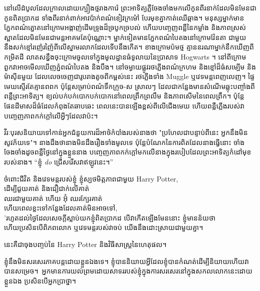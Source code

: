 {{{{{\later

នៅលើដំបូលដែលក្រាលដោយក្បឿងថ្មរាងការ៉េ ព្រះអាទិត្យភ្លឺចែងចាំងមកលើកូនពីរនាក់ដែលមិនមែនជាកូនពិតប្រាកដ ទាំងពីរនាក់ពាក់អាវប៉ាក់ពណ៌ខៀវក្រម៉ៅ បែរមុខគ្នាកាត់ឈើឆ្កាង។ មនុស្សម្នាក់មានភ្នែកពណ៌ត្នោតនៅក្រោមអង្កាញ់ដើមទ្រូងដ៏ច្របូកច្របល់ ហើយបញ្ចេញពន្លឺនៃកម្លាំង និងភាពស្រស់ស្អាតដែលមិនមែនជាមន្តអាគមតែប៉ុណ្ណោះ។ ម្នាក់ទៀតមានភ្នែកពណ៌បៃតងនៅក្រោមវ៉ែនតា ជាមួយនឹងសក់ខ្មៅរញ៉េរញ៉ៃពីលើស្នាមរលាកដែលទើបនឹងកើត។ ខាងក្រោមប៉មថ្ម គ្មាននរណាម្នាក់នឹកឃើញពីកម្រិតដី លាតសន្ធឹងចុះក្រោមចូលទៅក្នុងមូលដ្ឋានធំទូលាយនៃប្រាសាទ Hogwarts ។ នៅពីក្រោមពួកវាអាចមើលឃើញភ្នំពណ៌បៃតង និងបឹង។ នៅចម្ងាយផ្លូវរថភ្លើងពណ៌ក្រហម និងខ្មៅដ៏ធំសម្បើម និងម៉ាស៊ីនមួយ ដែលលេចចេញជារូបរាងតូចពីកម្ពស់នេះ រថភ្លើងទាំង Muggle ឬវេទមន្តពេញលេញ។ ផ្ទៃមេឃស្ទើរតែគ្មានពពក ប៉ុន្តែសម្រាប់ពណ៌ទឹកក្រូច-ស ស្រាលៗ ដែលជាកន្លែងមានសំណើមឆ្លុះបញ្ចាំងពីពន្លឺព្រះអាទិត្យ។ ខ្យល់បក់បក់បោកបក់បោកនៅពេលព្រឹកព្រលឹម និងភាពសើមនៃពេលព្រឹក។ ប៉ុន្តែ ផែនដីមាសដ៏ធំដែលកំពុងតែឆាបឆេះ ពេលនេះបានឡើងខ្ពស់ពីលើជើងមេឃ ហើយពន្លឺភ្លើងរបស់វាបញ្ចេញភាពកក់ក្តៅលើអ្វីៗដែលវាប៉ះ។

វីរៈបុរសនិយាយទៅកាន់អ្នកជំនួយការដ៏អាថ៌កំបាំងរបស់នាងថា "ប្រហែលជាបន្ទាប់ពីនេះ អ្នកនឹងមិនសូវភ័យទេ"។ នាងដឹងថានាងមិនដឹងរឿងទាំងមូលទេ ប៉ុន្តែបំណែកនៃការពិតដែលនាងធ្វើនោះ ចាំងចែងចាំងដូចពន្លឺថ្ងៃនៅក្នុងខ្លួននាង បញ្ចេញភាពកក់ក្តៅមកលើនាងក្នុងរបៀបដែលព្រះអាទិត្យកំដៅមុខរបស់នាង។ “ខ្ញុំ \emph{do} ជ្រើសរើសវាឥឡូវនេះ។”

\begin{em}
\noindent{}ចំពោះជីវិត និងវេទមន្តរបស់ខ្ញុំ ខ្ញុំស្បថមិត្តភាពជាមួយ Harry Potter,\\
ដើម្បីជួយគាត់ និងជឿជាក់លើគាត់\\
ឈរជាមួយគាត់ ហើយ អ៊ុំ ឈរក្បែរគាត់ \\
ហើយពេលខ្លះទៅកន្លែងដែលគាត់មិនអាចទៅ,\\
'រហូតដល់ថ្ងៃដែលសេចក្តីស្លាប់យកខ្ញុំពិតប្រាកដ បើវាកើតឡើងមែននោះ ខ្ញុំមានន័យថា\\
ហើយប្រសិនបើពិភពលោក ឬវេទមន្តរបស់វាចប់ យើងនឹងដោះស្រាយជាមួយគ្នា។
\end{em}

\newpage
\begin{chapterOpeningAuthorNote}
នេះគឺជាចុងបញ្ចប់នៃ Harry Potter និងវិធីសាស្រ្តនៃហេតុផល។

ខ្ញុំនឹងមិនសរសេរភាគបន្តដោយខ្លួនឯងទេ។ ខ្ញុំ​បាន​និយាយ​អ្វី​ដែល​ខ្ញុំ​បាន​កំណត់​ដើម្បី​និយាយ​ហើយ​វា​បាន​សម្រេច​។\
អ្នកមានការយល់ព្រមដោយសាទររបស់ខ្ញុំក្នុងការសរសេរនៅក្នុងសកលលោកនេះដោយខ្លួនឯង ប្រសិនបើអ្នកប្រាថ្នា។



\end{chapterOpeningAuthorNote}}}}}}
